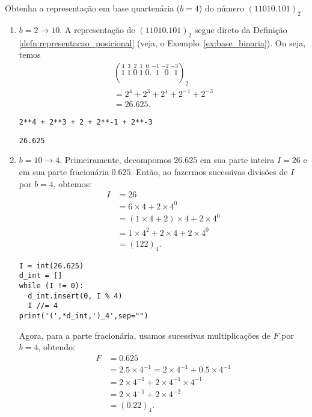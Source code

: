 \begin{ex}
  Obtenha a representação em base quartenária ($b=4$) do número $(11010.101)_2$.
  \begin{enumerate}[1.]
  \item $b=2 \to 10$. 
    A representação de $(11010.101)_2$ segue direto da Definição \ref{defn:representacao_posicional} (veja, o Exemplo~\ref{ex:base_binaria}). Ou seja, temos
    \begin{gather}
      (\stackrel{4}{1}~\stackrel{3}{1}~\stackrel{2}{0}~\stackrel{1}{1}~\stackrel{0}{0}.\stackrel{-1}{~\,1}~\stackrel{-2}{~\,0}~\stackrel{-3}{~\,1})_2 \\
      = 2^4 + 2^3 + 2^1 + 2^{-1} + 2^{-3} \\
      = 26.625.
    \end{gather}

\begin{lstlisting}
2**4 + 2**3 + 2 + 2**-1 + 2**-3
\end{lstlisting}

\begin{verbatim}
26.625
\end{verbatim}

  \item $b=10 \to 4$.
    Primeiramente, decompomos $26.625$ em sua parte inteira $I = 26$ e em sua parte fracionária $0.625$. Então, ao fazermos sucessivas divisões de $I$ por $b=4$, obtemos:
    \begin{align}
      I &= 26\\
        &= 6\times 4 + 2\times 4^0\\
        &= (1\times 4 + 2)\times 4 + 2\times 4^0\\
        &= 1\times 4^2 + 2\times 4 + 2\times 4^0\\
        &= (122)_4.
    \end{align}

\begin{lstlisting}
I = int(26.625)
d_int = []
while (I != 0):
  d_int.insert(0, I % 4)
  I //= 4
print('(',*d_int,')_4',sep="")
\end{lstlisting}
    
    Agora, para a parte fracionária, usamos sucessivas multiplicações de $F$ por $b=4$, obtendo:
    \begin{align}
      F &= 0.625\\
        &= 2.5\times 4^{-1} = 2\times 4^{-1} + 0.5\times 4^{-1}\\
        &= 2\times 4^{-1} + 2\times 4^{-1}\times 4^{-1}\\
        &= 2\times 4^{-1} + 2\times 4^{-2}\\
        &= (0.22)_{4}.
    \end{align}


\end{enumerate}
\end{ex}

